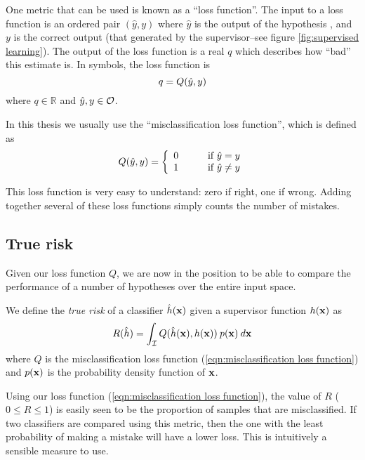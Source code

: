 One metric that can be used is known as a ``loss function''.  The
input to a loss function is an ordered pair $(\hat{y}, y)$ where
$\hat{y}$ is the output of the hypothesis , and $y$ is the correct
output (that generated by the supervisor--see figure
\ref{fig:supervised learning}).  The output of 
the loss function is a real $q$ which describes how ``bad'' this
estimate is.  In symbols, the loss function is
%
\begin{equation}
q = Q(\hat{y}, y)
\end{equation}
where $q \in \mathbb{R}$ and $\hat{y}, y \in \mathcal{O}$.

In this thesis we usually use the ``misclassification loss function'',
which is defined as 
%
\begin{equation}
Q(\hat{y}, y) = \left\{
\begin{array}{ll}
	0	&	\qquad \mbox{if $\hat{y} = y$} \\
	1	&	\qquad \mbox{if $\hat{y} \neq y$}
\end{array}
\right.
\label{eqn:misclassification loss function}
\end{equation}

This loss function is very easy to understand: zero if right, one if
wrong.  Adding together several of these loss functions simply counts
the number of mistakes.


\subsection{True risk}
\label{sec:true risk}

Given our loss function $Q$, we are now in the position to be
able to compare the performance of a number of hypotheses over the
entire input space.

\begin{definition}
We define the \emph{true risk} of a classifier $\hat{h}(\mathbf{x})$ given a
supervisor function $h(\mathbf{x})$ as 
%
\begin{equation}
R(\hat{h}) = \int_{\mathcal{I}} Q(\hat{h}(\mathbf{x}), h(\mathbf{x})) \: p(\mathbf{x}) \: d\mathbf{x}
\label{eqn:true risk}
\end{equation}
%
where $Q$ is the misclassification loss function
(\ref{eqn:misclassification loss function}) and $p(\mathbf{x})$ is the
probability density function of $\mathbf{x}$.
\end{definition}


Using our loss function (\ref{eqn:misclassification loss function}), the
value of $R$ ($0 \leq R \leq 1$) is easily seen to be the proportion
of samples that are misclassified.  If two classifiers are compared
using this metric, then the one with the least probability of making a
mistake will have a lower loss.  This is intuitively a sensible
measure to use.

